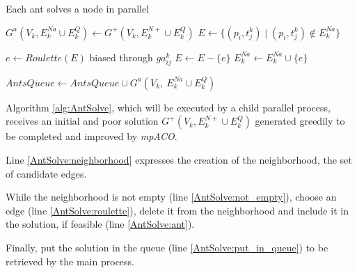 \documentclass[preprint,authoryear]{elsarticle}
\begin{document}
\begin{algorithm}[H] 
	\caption{Each ant solves a node in parallel} \label{alg:AntSolve}
	\begin{algorithmic}[1]
		
		
		\State $G^a(V_k, E^{Na}_k \cup E^Q_k) \gets G^+(V_k, E^{N+}_k \cup E^Q_k)$
		\State $E \gets \{ (p_i,t^k_j) \mid (p_i,t^k_j) \not\in E^{Na}_k \}$ \label{AntSolve:neighborhood}
		 \label{AntSolve:not_empty}
		
			\State $e \gets Roulette(E)$ biased through $ga^k_{ij}$  \label{AntSolve:roulette}
			\State $E \gets E - \{e\}$		
				\State $ E^{Na}_k \gets E^{Na}_k \cup \{e\} $ \label{AntSolve:ant}
			\EndIf
			
		\EndWhile
		
		
		\State $AntsQueue \gets AntsQueue \cup G^a(V_k,\ E^{Na}_k \cup E^Q_k)$ \label{AntSolve:put_in_queue}
		
		\EndProcedure
	\end{algorithmic}
\end{algorithm}

Algorithm \ref{alg:AntSolve}, which will be executed by a child parallel process, receives an initial and poor solution $G^+(V_k, E^{N+}_k \cup E^Q_k)$ generated greedily to be completed and improved by {\it mpACO}.

Line \ref{AntSolve:neighborhood} expresses the creation of the neighborhood, the set of candidate edges.

While the neighborhood is not empty (line \ref{AntSolve:not_empty}), choose an edge (line \ref{AntSolve:roulette}), delete it from the neighborhood and include it in the solution, if feasible (line \ref{AntSolve:ant}).

Finally, put the solution in the queue (line \ref{AntSolve:put_in_queue}) to be retrieved by the main process.

\end{document}
